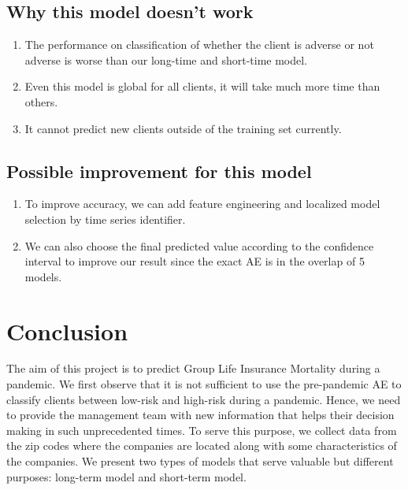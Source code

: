 \documentclass[
]{article}
\providecommand{\tightlist}{%
  \setlength{\itemsep}{0pt}\setlength{\parskip}{0pt}}
\begin{document}
\hypertarget{why-this-model-doesnt-work}{%
\subsection{Why this model doesn't
work}\label{why-this-model-doesnt-work}}

\begin{enumerate}
\def\labelenumi{\arabic{enumi}.}
\tightlist
\item
  The performance on classification of whether the client is adverse or
  not adverse is worse than our long-time and short-time model.
\item
  Even this model is global for all clients, it will take much more time
  than others.
\item
  It cannot predict new clients outside of the training set currently.
\end{enumerate}

\hypertarget{possible-improvement-for-this-model}{%
\subsection{Possible improvement for this
model}\label{possible-improvement-for-this-model}}

\begin{enumerate}
\def\labelenumi{\arabic{enumi}.}
\tightlist
\item
  To improve accuracy, we can add feature engineering and localized
  model selection by time series identifier.
\item
  We can also choose the final predicted value according to the
  confidence interval to improve our result since the exact AE is in the
  overlap of 5 models.
\end{enumerate}

\hypertarget{conclusion}{%
\section{Conclusion}\label{conclusion}}

The aim of this project is to predict Group Life Insurance Mortality
during a pandemic. We first observe that it is not sufficient to use the
pre-pandemic AE to classify clients between low-risk and high-risk
during a pandemic. Hence, we need to provide the management team with
new information that helps their decision making in such unprecedented
times. To serve this purpose, we collect data from the zip codes where
the companies are located along with some characteristics of the
companies. We present two types of models that serve valuable but
different purposes: long-term model and short-term model.
\end{document}
